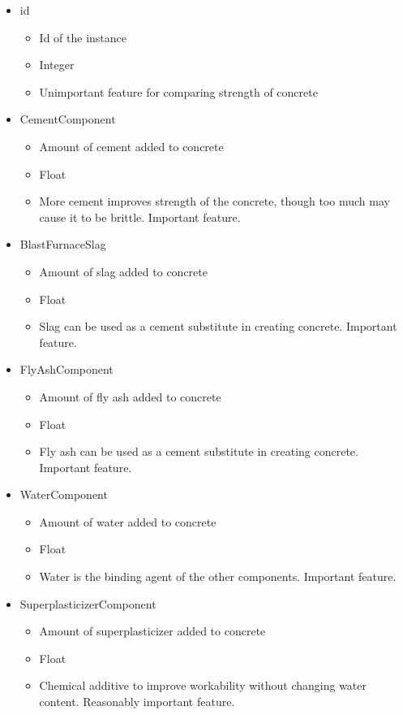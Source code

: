 \documentclass[onecolumn, 11pt]{article}
\begin{document}
\begin{itemize}
  \item id
  \begin{itemize}
    \item Id of the instance
    \item Integer
    \item Unimportant feature for comparing strength of concrete
  \end{itemize}
  \item CementComponent
  \begin{itemize}
    \item Amount of cement added to concrete 
    \item Float
    \item More cement improves strength of the concrete, though too much may cause it to be brittle. Important feature. 
  \end{itemize}
  \item BlastFurnaceSlag
  \begin{itemize}
    \item Amount of slag added to concrete 
    \item Float
    \item Slag can be used as a cement substitute in creating concrete. Important feature. 
  \end{itemize}
  \item FlyAshComponent
  \begin{itemize}
    \item Amount of fly ash added to concrete 
    \item Float
    \item Fly ash can be used as a cement substitute in creating concrete. Important feature.
  \end{itemize}
  \item WaterComponent
  \begin{itemize}
    \item Amount of water added to concrete 
    \item Float
    \item Water is the binding agent of the other components. Important feature. 
  \end{itemize}
  \item SuperplasticizerComponent
  \begin{itemize}
    \item Amount of superplasticizer added to concrete 
    \item Float
    \item Chemical additive to improve workability without changing water content. Reasonably important feature. 

\end{itemize}
\end{itemize}
\end{document}
